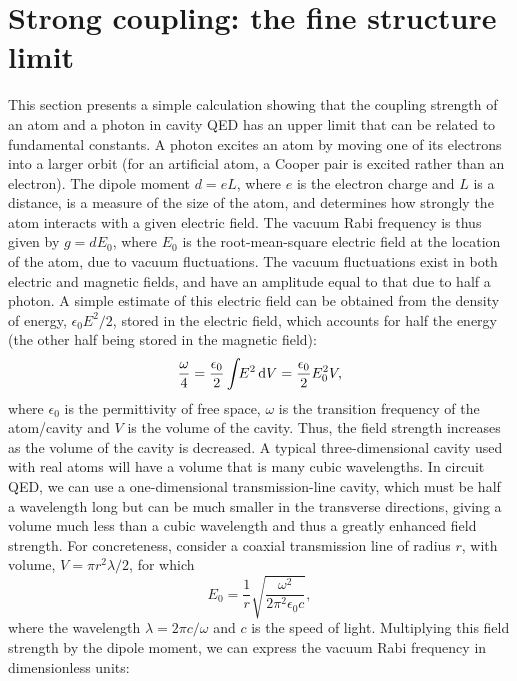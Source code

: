 \section{Strong coupling: the fine structure limit}
\label{sec:strong}
This section presents a simple calculation \cite{schoelkopf_wiring_2008, haroche_raimond_exploring, devoret_circuit-qed:_2007} showing that the coupling strength of an atom and a photon in cavity QED has an upper limit that can be related to fundamental constants. A photon excites an atom by moving one of its electrons into a larger orbit (for an artificial atom, a Cooper pair is excited rather than an electron). The dipole moment $d = eL$, where $e$ is the electron charge and $L$ is a distance, is a measure of the size of the atom, and determines how strongly the atom interacts with a given electric field. The vacuum Rabi frequency is thus given by $g = d E_0$, where $E_0$ is the root-mean-square electric field at the location of the atom, due to vacuum fluctuations. The vacuum fluctuations exist in both electric and magnetic fields, and have an amplitude equal to that due to half a photon. A simple estimate of this electric field can be obtained from the density of energy, $\epsilon_0 E^2/2$, stored in the electric field, which accounts for half the energy (the other half being stored in the magnetic field):%
%
\begin{equation}
    \label{eq:efielden}
    \frac{\omega}{4}=\frac{\epsilon_0}{2}\int\!\!E^2\,\mathrm{d} V = \frac{\epsilon_0}{2}E_0^2 V ,
\end{equation}
where $\epsilon_0$ is the permittivity of free space, $\omega$ is the transition frequency of the atom/cavity and $V$ is the volume of the cavity. Thus, the field strength increases as the volume of the cavity is decreased. A typical three-dimensional cavity used with real atoms will have a volume that is many cubic wavelengths. In circuit QED, we can use a one-dimensional transmission-line cavity, which must be half a wavelength long but can be much smaller in the transverse directions, giving a volume much less than a cubic wavelength and thus a greatly enhanced field strength. For concreteness, consider a coaxial transmission line of radius $r$, with volume, $V = \pi r^2\lambda/2$, for which
\begin{equation}
    \label{eq:efield1d}
    E_0=\frac{1}{r}\sqrt{\frac{\omega^2}{2\pi^2\epsilon_0 c}} ,
\end{equation}
where the wavelength $\lambda=2\pi c/\omega$ and $c$ is the speed of light. Multiplying this field strength by the dipole moment, we can express the vacuum Rabi frequency in dimensionless units:
